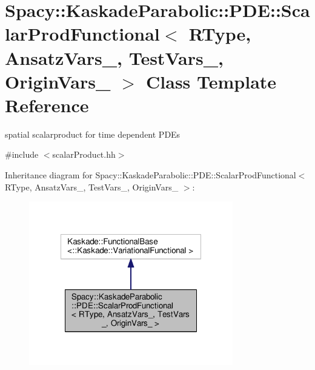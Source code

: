 \hypertarget{classSpacy_1_1KaskadeParabolic_1_1PDE_1_1ScalarProdFunctional}{\section{Spacy\-:\-:Kaskade\-Parabolic\-:\-:P\-D\-E\-:\-:Scalar\-Prod\-Functional$<$ R\-Type, Ansatz\-Vars\-\_\-, Test\-Vars\-\_\-, Origin\-Vars\-\_\- $>$ Class Template Reference}
\label{classSpacy_1_1KaskadeParabolic_1_1PDE_1_1ScalarProdFunctional}
}


spatial scalarproduct for time dependent P\-D\-Es  




{\ttfamily \#include $<$scalar\-Product.\-hh$>$}



Inheritance diagram for Spacy\-:\-:Kaskade\-Parabolic\-:\-:P\-D\-E\-:\-:Scalar\-Prod\-Functional$<$ R\-Type, Ansatz\-Vars\-\_\-, Test\-Vars\-\_\-, Origin\-Vars\-\_\- $>$\-:
\nopagebreak
\begin{figure}[H]
\begin{center}
\leavevmode
\includegraphics[width=252pt]{classSpacy_1_1KaskadeParabolic_1_1PDE_1_1ScalarProdFunctional__inherit__graph}
\end{center}
\end{figure}


